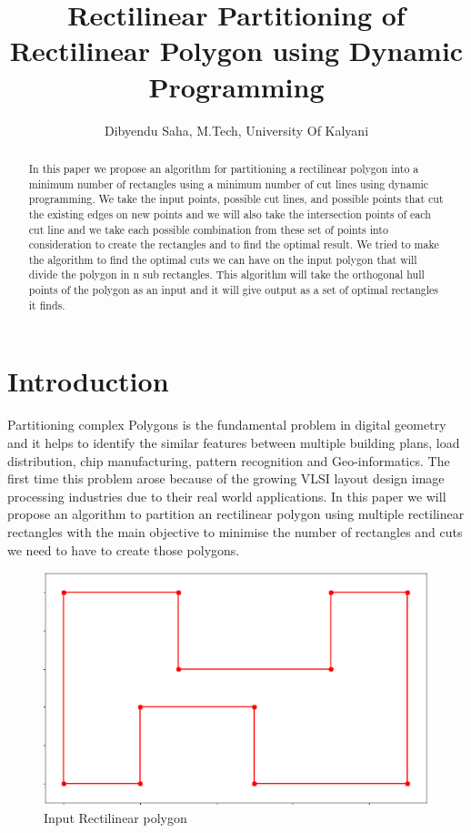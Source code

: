\documentclass[a4paper,17pt]{article}
\title{Rectilinear Partitioning of Rectilinear Polygon using Dynamic Programming}
\author{Dibyendu Saha, M.Tech, University Of Kalyani\linebreak}
\date{}
\begin{document}
\maketitle

\begin{abstract}
In this paper we propose an algorithm for partitioning a rectilinear polygon into a minimum number of rectangles using a minimum number of cut lines using dynamic programming. We take the input points, possible cut lines, and possible points that cut the existing edges on new points and we will also take the intersection points of each cut line and we take each possible combination from these set of points into consideration to create the rectangles and to find the optimal result. We tried to make the algorithm to find the optimal cuts we can have on the input polygon that will divide the polygon in n sub rectangles. This algorithm will take the orthogonal hull points of the polygon as an input and it will give output as a set of optimal rectangles it finds. 
\end{abstract}

\section{Introduction}

Partitioning complex Polygons is the fundamental problem in digital geometry and it helps to identify the similar features between multiple building plans, load distribution, chip manufacturing, pattern recognition and Geo-informatics. The first time this problem arose because of the growing VLSI layout design image processing industries due to their real world applications. In this paper we will propose an algorithm to partition an rectilinear polygon using multiple rectilinear rectangles with the main objective to minimise the number of rectangles and cuts we need to have to create those polygons. 

\vspace{5mm} %

\begin{figure}[!h]
\centering
\includegraphics[width=1\textwidth]{input-rectilinear-polygon.png}
\caption{Input Rectilinear polygon}
\label{fig:IRP}
\end{figure}
\end{document}
